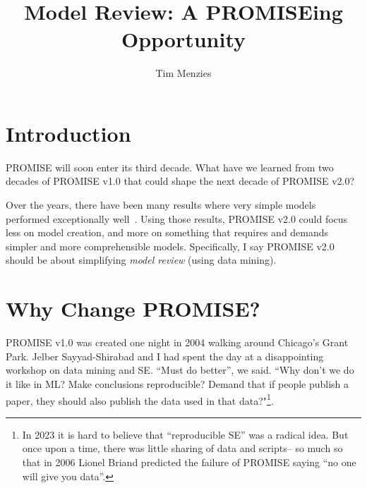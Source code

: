 \documentclass[sigconf,screen]{acmart}
\begin{document}
\title{Model Review: A PROMISEing Opportunity}

\author{Tim Menzies}
\maketitle
\section{Introduction}
PROMISE will soon enter its third decade. 
 What have we learned from two decades of PROMISE v1.0 that could shape the next decade of PROMISE v2.0?
 
Over the years, there have been many results
where   very simple models performed exceptionally well~\cite{Holte1993VerySC,menzies2008implications,agrawal2019dodge,Xu21,Tawosi23,Kohavi97}.
Using those results,   PROMISE v2.0 could focus less on model creation,  and more on something that requires and demands simpler and more comprehensible models. 
Specifically, I say PROMISE v2.0 should be about simplifying  {\em model review} (using data mining).







\section{  Why Change   PROMISE?}

  PROMISE v1.0 was created one night in 2004 walking around Chicago's Grant Park. Jelber Sayyad-Shirabad and I had spent the day at a disappointing workshop
on data mining and SE. ``Must do better'', we said.  ``Why don't we do it  like in ML? Make conclusions reproducible? Demand that if people publish a paper, they should also publish the data used in that data?"\footnote{
In 2023 it is  hard to believe that ``reproducible SE'' was a radical idea.  But once upon a time, there was little sharing of data and scripts-- so much so that in 2006 Lionel Briand predicted the failure of PROMISE saying ``no one will give you data''.}.
\end{document}
